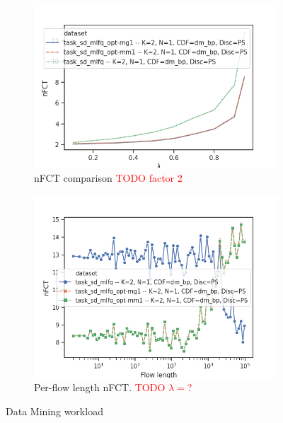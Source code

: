 \begin{figure}
	\centering
	\begin{subfigure}{.5\textwidth}
		\centering
		\includegraphics[width=1.05\textwidth]{Chapter3/Figures/dm_ps_comparison.png}
		\caption{nFCT comparison \textcolor{red}{TODO factor 2}}
		\label{fig:optlbgain-dm}
	\end{subfigure}%
	\begin{subfigure}{.5\textwidth}
		\centering
		\includegraphics[width=\textwidth]{Chapter3/Figures/dm_ps_detailed.png}
		\caption{Per-flow length nFCT. \textcolor{red}{TODO $\lambda=$?}}
		\label{fig:optlbgainvsflowsize-dm}
	\end{subfigure}%
	\caption{Data Mining workload}
	\label{fig:optlb-dm}
\end{figure}%
